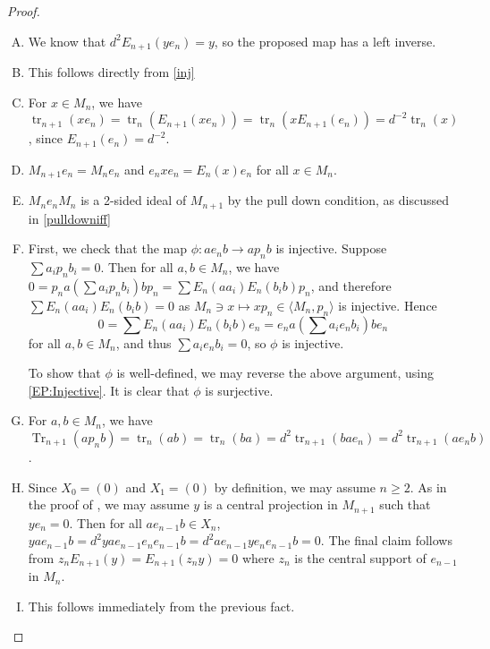 \documentclass[11pt]{article}
\theoremstyle{plain}
\theoremstyle{definition}
\DeclareMathOperator{\Tr}{Tr}
\DeclareMathOperator{\tr}{tr}
\begin{document}
\begin{proof} 

\begin{enumerate}[(A)]
\item\label{inj}

We know that $d^2E_{n+1}(ye_n) = y $, so the proposed map has a left inverse.

\item

This follows directly from \eqref{inj}

\item

For $x\in M_n$, we have $\tr_{n+1}(xe_n) = \tr_n(E_{n+1}(xe_n)) = \tr_n(x E_{n+1}(e_n)) = d^{-2} \tr_n(x)$, since $E_{n+1}(e_n) = d^{-2}$.

\item

$M_{n+1} e_n = M_n e_n$ and $e_nxe_n = E_n(x)e_n$ for all $x\in M_n$.

\item

$M_ne_nM_n$ is a 2-sided ideal of $M_{n+1}$ by the pull down condition, as discussed in \eqref{pulldowniff}

\item

First, we check that the map $\phi:ae_nb\to ap_nb$ is injective. 
Suppose $\sum a_i p_n b_i = 0$.
Then for all $a,b\in M_n$, we have $0=p_na\left(\sum a_i p_n b_i\right) bp_n = \sum E_{n}(aa_i)E_n(b_ib)p_n$, and therefore $\sum E_{n}(aa_i)E_n(b_ib) = 0$ as $M_n \ni x\mapsto xp_n \in \langle M_n, p_n\rangle$ is injective.
Hence $$0 = \sum E_{n}(aa_i)E_n(b_ib)e_n = e_na\left(\sum a_i e_n b_i\right) be_n$$ for all $a,b\in M_n$, and thus $\sum a_i e_n b_i = 0$, so $\phi$ is injective. 

		To show that $\phi$ is well-defined, we may reverse the above argument, using \eqref{EP:Injective}. 
		It is clear that $\phi$ is surjective. 

\item

For $a,b\in M_n$, we have 
$\Tr_{n+1}(ap_n b) = \tr_n(ab) = \tr_n(ba) = d^2\tr_{n+1}(bae_n) = d^2 \tr_{n+1}(ae_n b)$.

\item

Since $X_0 = (0)$ and $X_1 = (0)$ by definition, we may assume $n\geq 2$.
As in the proof of \cite[Thm.~4.6.3.vi]{MR999799}, we may assume $y$ is a central projection in $M_{n+1}$ such that $y e_{n} = 0$.
Then for all $ae_{n-1} b \in X_n$, $y ae_{n-1} b = d^2 yae_{n-1} e_{n}e_{n-1} b = d^2 ae_{n-1} ye_{n} e_{n-1} b = 0$.
The final claim follows from $z_{n}E_{n+1}(y) = E_{n+1}(z_n y)= 0$ where $z_n$ is the central support of $e_{n-1}$ in $M_n$.

\item

This follows immediately from the previous fact.

\end{enumerate}

\end{proof}
\end{document}
